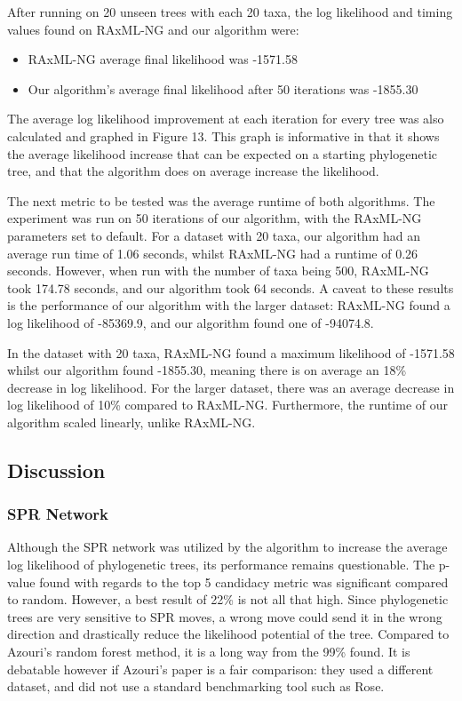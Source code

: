 \documentclass{mpaper}
\begin{document}
After running on 20 unseen trees with each 20 taxa, the log likelihood and timing values found on RAxML-NG and our algorithm were:

\begin{itemize}
    \item RAxML-NG average final likelihood was -1571.58
    \item Our algorithm's average final likelihood after 50 iterations was -1855.30
\end{itemize}

The average log likelihood improvement at each iteration for every tree was also calculated and graphed in Figure 13. This graph is informative in that it shows the average likelihood increase that can be expected on a starting phylogenetic tree, and that the algorithm does on average increase the likelihood.

The next metric to be tested was the average runtime of both algorithms. The experiment was run on 50 iterations of our algorithm, with the RAxML-NG parameters set to default. For a dataset with 20 taxa, our algorithm had an average run time of 1.06 seconds, whilst RAxML-NG had a runtime of 0.26 seconds. However, when run with the number of taxa being 500, RAxML-NG took 174.78 seconds, and our algorithm took 64 seconds. A caveat to these results is the performance of our algorithm with the larger dataset: RAxML-NG found a log likelihood of -85369.9, and our algorithm found one of -94074.8. 

In the dataset with 20 taxa, RAxML-NG found a maximum likelihood of -1571.58 whilst our algorithm found \mbox{-1855.30}, meaning there is on average an 18\% decrease in log likelihood. For the larger dataset, there was an average decrease in log likelihood of 10\% compared to RAxML-NG. Furthermore, the runtime of our algorithm scaled linearly, unlike RAxML-NG. 

\subsection{Discussion}

\subsubsection{SPR Network}

Although the SPR network was utilized by the algorithm to increase the average log likelihood of phylogenetic trees, its performance remains questionable. The p-value found with regards to the top 5 candidacy metric was significant compared to random. However, a best result of 22\% is not all that high. Since phylogenetic trees are very sensitive to SPR moves, a wrong move could send it in the wrong direction and drastically reduce the likelihood potential of the tree. Compared to Azouri's random forest method, it is a long way from the 99\% found. It is debatable however if Azouri's paper is a fair comparison: they used a different dataset, and did not use a standard benchmarking tool such as Rose. 
\end{document}
